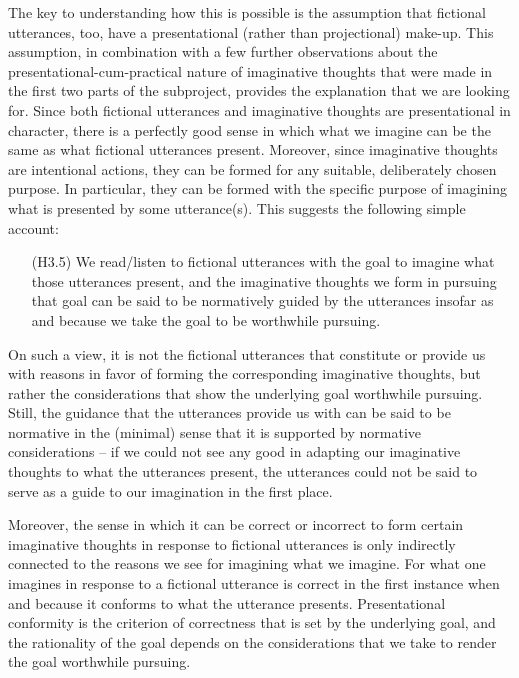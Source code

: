 \noindent The key to understanding how this is possible is the assumption that fictional utterances, too, have a presentational (rather than projectional) make-up. This assumption, in combination with a few further observations about the presentational-cum-practical nature of imaginative thoughts that were made in the first two parts of the subproject, provides the explanation that we are looking for. Since both fictional utterances and imaginative thoughts are presentational in character, there is a perfectly good sense in which what we imagine can be the same as what fictional utterances present. Moreover, since imaginative thoughts are intentional actions, they can be formed for any suitable, deliberately chosen purpose. In particular, they can be formed with the specific purpose of imagining what is presented by some utterance(s). This suggests the following simple account:

\vspace{-.1cm}
\begin{itemize}[leftmargin=2cm]
\item[(H3.5)] We read/listen to fictional utterances with the goal to imagine what those utterances present, and the imaginative thoughts we form in pursuing that goal can be said to be normatively guided by the utterances insofar as and because we take the goal to be worthwhile pursuing.
\end{itemize}
\vspace{-.1cm}

\noindent On such a view, it is not the fictional utterances that constitute or provide us with reasons in favor of forming the corresponding imaginative thoughts, but rather the considerations that show the underlying goal worthwhile pursuing. Still, the guidance that the utterances provide us with can be said to be normative in the (minimal) sense that it is supported by normative considerations -- if we could not see any good in adapting our imaginative thoughts to what the utterances present, the utterances could not be said to serve as a guide to our imagination in the first place.

Moreover, the sense in which it can be correct or incorrect to form certain imaginative thoughts in response to fictional utterances is only indirectly connected to the reasons we see for imagining what we imagine. For what one imagines in response to a fictional utterance is correct in the first instance when and because it conforms to what the utterance presents. Presentational conformity is the criterion of correctness that is set by the underlying goal, and the rationality of the goal depends on the considerations that we take to render the goal worthwhile pursuing.

